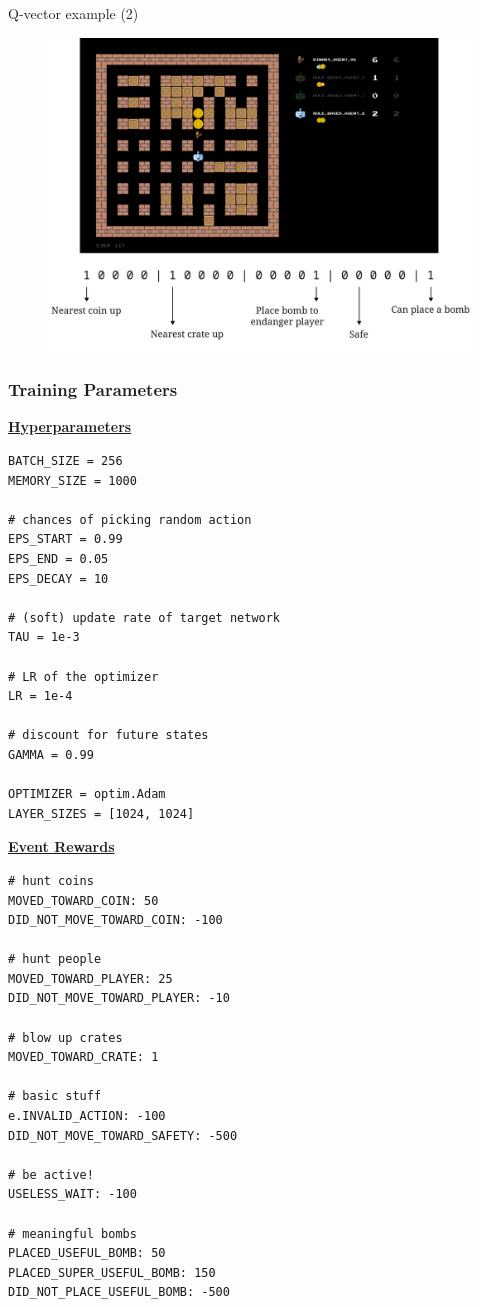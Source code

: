 \documentclass{beamer}
\begin{document}
\begin{frame}{Q-vector example (2)}
	\pause
	\begin{figure}[t]
			\centering
			\includegraphics[width=.8\linewidth]{q-vector-2.pdf}
	\end{figure}
\end{frame}

\begin{frame}[fragile]
	\frametitle{Training Parameters}
	\pause
	\vspace{-1.3em}%
	\begin{minipage}[t]{.5\textwidth}
\small
\underline{\textbf{Hyperparameters}}
\fontsize{6}{8}
\begin{verbatim}
BATCH_SIZE = 256
MEMORY_SIZE = 1000

# chances of picking random action
EPS_START = 0.99
EPS_END = 0.05
EPS_DECAY = 10

# (soft) update rate of target network
TAU = 1e-3

# LR of the optimizer
LR = 1e-4

# discount for future states
GAMMA = 0.99

OPTIMIZER = optim.Adam
LAYER_SIZES = [1024, 1024]
\end{verbatim}
\end{minipage}%
	\begin{minipage}[t]{.5\textwidth}
\small
\underline{\textbf{Event Rewards}}
\fontsize{6}{8}
\begin{verbatim}
# hunt coins
MOVED_TOWARD_COIN: 50
DID_NOT_MOVE_TOWARD_COIN: -100

# hunt people
MOVED_TOWARD_PLAYER: 25
DID_NOT_MOVE_TOWARD_PLAYER: -10

# blow up crates
MOVED_TOWARD_CRATE: 1

# basic stuff
e.INVALID_ACTION: -100
DID_NOT_MOVE_TOWARD_SAFETY: -500

# be active!
USELESS_WAIT: -100

# meaningful bombs
PLACED_USEFUL_BOMB: 50
PLACED_SUPER_USEFUL_BOMB: 150
DID_NOT_PLACE_USEFUL_BOMB: -500
\end{verbatim}
\end{minipage}%
\end{frame}
\end{document}
